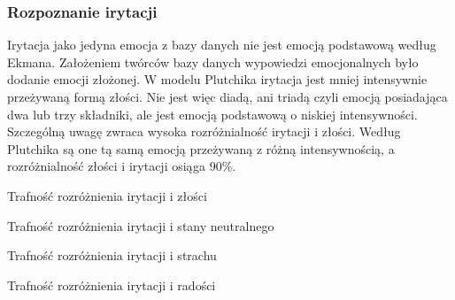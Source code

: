 \documentclass[a4paper,12pt,twoside,openany]{report}
\begin{document}
\subsubsection{Rozpoznanie irytacji}
Irytacja jako jedyna emocja z bazy danych nie jest emocją podstawową według Ekmana.
Założeniem twórców bazy danych wypowiedzi emocjonalnych było dodanie emocji złożonej.
W modelu Plutchika irytacja jest mniej intensywnie przeżywaną formą złości.
Nie jest więc diadą, ani triadą czyli emocją posiadająca dwa lub trzy składniki,
ale jest emocją podstawową o niskiej intensywności.
Szczególną uwagę zwraca wysoka rozróżnialność irytacji i złości.
Według Plutchika są one tą samą emocją przeżywaną z różną intensywnością,
a rozróżnialność złości i irytacji osiąga 90\%.
\begin{table}[hc!]
	\centering
	
	\caption{Trafność rozróżnienia irytacji i złości}
	\label{tab:irytacja:zlosc}
\end{table}
\begin{table}[hc!]
	\centering
	
	\caption{Trafność rozróżnienia irytacji i stany neutralnego}
	\label{tab:irytacja:neutralny}
\end{table}
\begin{table}[hc!]
	\centering
	
	\caption{Trafność rozróżnienia irytacji i strachu}
	\label{tab:irytacja:strach}
\end{table}
\begin{table}[hc!]
	\centering
	
	\caption{Trafność rozróżnienia irytacji i radości}
	\label{tab:irytacja:zlosc}
\end{table}
%	
%	
\end{document}
